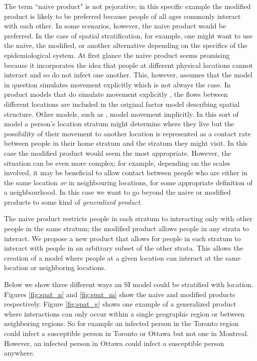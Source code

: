 \documentclass[pdflatex,sn-basic]{sn-jnl}%
\theoremstyle{definition}
\newcommand{\define}[1]{\emph{{#1}}}
\begin{document}
The term “naive product" is not pejorative; in this specific example the modified product is likely to be preferred because people of all ages commonly interact with each other. In some scenarios, however, the naive product would be preferred. In the case of spatial stratification, for example, one might want to use the naive, the modified, or another alternative depending on the specifics of the epidemiological system. At first glance the naive product seems promising because it incorporates the idea that people at different physical locations cannot interact and so do not infect one another. This, however, assumes that the model in question simulates movement explicitly which is not always the case. In product models that do simulate movement explicitly \cite[e.g.][]{mohammadi2023importation}, the flows between different locations are included in the original factor model describing spatial structure. Other models, such as \cite{dietz1995structured}, model movement implicitly. In this sort of model a person's location stratum might determine where they live but the possibility of their movement to another location is represented as a contact rate between people in their home stratum and the stratum they might visit. In this case the modified product would seem the most appropriate. However, the situation can be even more complex; for example, depending on the scales involved, it may be beneficial to allow contact between people who are either in the same location \emph{or} in neighbouring locations, for some appropriate definition of a neighbourhood. In this case we want to go beyond the naive or modified products to some kind of \define{generalized product}.


The naive product restricts people in each stratum to interacting only with other people in the same stratum; the modified product allows people in any strata to interact. We propose a new product that allows for people in each stratum to interact with people in an arbitrary subset of the other strata. This allows the creation of a model where people at a given location can interact at the same location or neighboring locations. 



Below we show three different ways an SI model could be stratified with location. Figures \ref{fig:spat_n} and \ref{fig:spat_m} show the naive and modified products respectively. Figure \ref{fig:spat_g} shows one example of a generalized product where interactions can only occur within a single geographic region or between neighboring regions. So for example an infected person in the Toronto region could infect a susceptible person in Toronto or Ottawa but not one in Montreal. However, an infected person in Ottawa could infect a susceptible person anywhere. 
\end{document}
